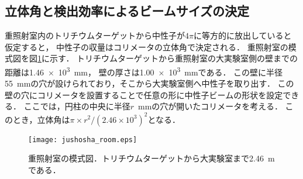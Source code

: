 \documentclass[../master]{subfiles}
\begin{document}
\subsection{立体角と検出効率によるビームサイズの決定}
重照射室内のトリチウムターゲットから中性子が$4\pi$に等方的に放出していると仮定すると，
中性子の収量はコリメータの立体角で決定される．
重照射室の模式図を図\ref{fig::jushosha_room}に示す．
トリチウムターゲットから重照射室の大実験室側の壁までの距離は\SI{1.46e3}{\milli\metre}，
壁の厚さは\SI{1.00e3}{\milli\metre}である．
この壁に半径\SI{55}{\milli\metre}の穴が設けられており，そこから大実験室側へ中性子を取り出す．
この壁の穴にコリメータを設置することで任意の形に中性子ビームの形状を設定できる．
ここでは，円柱の中央に半径$r$~\si{\milli\metre}の穴が開いたコリメータを考える．
このとき，立体角は$\pi\times r^2/\left(2.46\times10^3\right)^2$となる．
\begin{figure}
  \centering
  \texttt{[image: jushosha\_room.eps]}
  \caption{重照射室の模式図．トリチウムターゲットから大実験室まで\SI{2.46}{\metre}である．}
  \label{fig::jushosha_room}
\end{figure}
\end{document}

